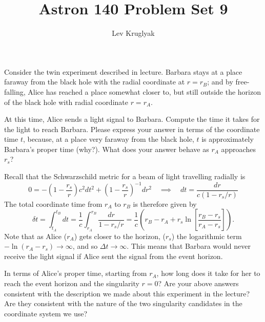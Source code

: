 \documentclass{../../templates/lkx_pset}
\title{Astron 140 Problem Set 9}
\author{Lev Kruglyak}
\begin{document}
\maketitle

\begin{problem}{1}
  Consider the twin experiment described in lecture. Barbara stays at a place faraway from the black hole with the radial coordinate at $r = r_B$; and by free-falling, Alice has reached a place somewhat closer to, but still outside the horizon of the black hole with radial coordinate $r=r_A$. 
\end{problem}
\begin{parts}
  \begin{part}{}
  At this time, Alice sends a light signal to Barbara. Compute the time it takes for the light to reach Barbara. Please express your answer in terms of the coordinate time $t$, because, at a place very faraway from the black hole, $t$ is approximately Barbara's proper time (why?).
    What does your answer behave as $r_A$ approaches $r_s$?
  \end{part}

  Recall that the Schwarzschild metric for a beam of light travelling radially is
  \[
    0 = - \left(1- \frac{r_s}{r}\right)c^2 dt^2 + \left(1- \frac{r_s}{r}\right)^{-1}dr^2\quad\implies\quad dt = \frac{dr}{c(1-r_s/r)}
  \]
  The total coordinate time from $r_A$ to $r_B$ is therefore given by
  \[
    \delta t = \int_{t_A}^{t_B} dt = \frac{1}{c}\int_{r_A}^{r_B}\frac{dr}{1-r_s/r} = \frac{1}{c}\left(r_B - r_A + r_s\ln\left[\frac{r_B - r_s}{r_A - r_s}\right]\right).
  \]
  Note that as Alice ($r_A$) gets closer to the horizon, ($r_s$) the logarithmic term $-\ln (r_A - r_s)\to \infty$, and so $\Delta t\to \infty$. This means that Barbara would never receive the light signal if Alice sent the signal from the event horizon.

  \begin{part}{}
    In terms of Alice's proper time, starting from $r_A$, how long does it take for her to reach the event horizon and the singularity $r=0$?
    Are your above answers consistent with the description we made about this experiment in the lecture? Are they consistent with the nature of the two singularity candidates in the coordinate system we use?
  \end{part}


\end{parts}
\end{document}
